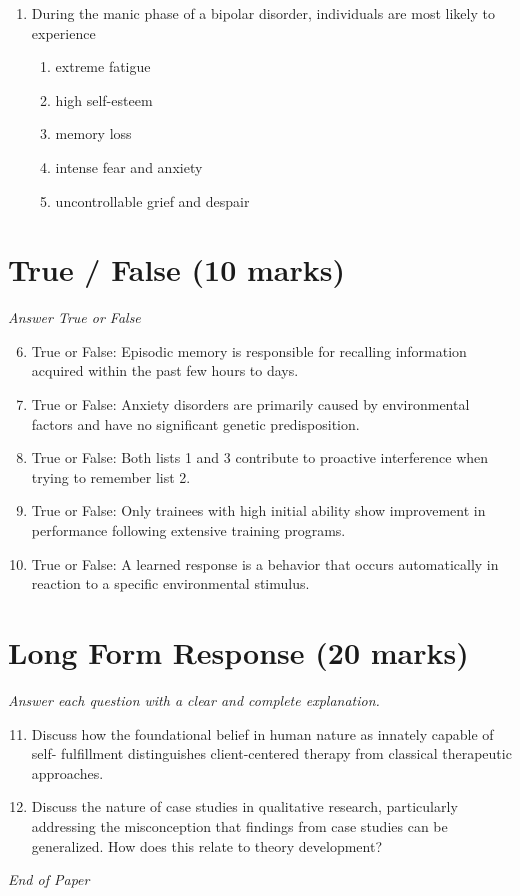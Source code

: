 \documentclass[12pt]{article}
\begin{document}
\begin{enumerate}[label=\arabic*.]
\begin{enumerate}[label=(\alph*)]
    \item Kendal's tau
    \item Biserial correlation
    \item Cramer's V
    \item Eta
    \item Goodman and Kruskal's gamma
\end{enumerate}
\item During the manic phase of a bipolar disorder, individuals are most likely to experience
\begin{enumerate}[label=(\alph*)]
    \item extreme fatigue
    \item high self-esteem
    \item memory loss
    \item intense fear and anxiety
    \item uncontrollable grief and despair
\end{enumerate}
\end{enumerate}

\section*{True / False (10 marks)}
\textit{Answer True or False}
\begin{enumerate}[label=\arabic*.]
\setcounter{enumi}{5}
\item True or False: Episodic memory is responsible for recalling information acquired within the past few hours to days.
\item True or False: Anxiety disorders are primarily caused by environmental factors and have no significant genetic predisposition.
\item True or False: Both lists 1 and 3 contribute to proactive interference when trying to remember list 2.
\item True or False: Only trainees with high initial ability show improvement in performance following extensive training programs.
\item True or False: A learned response is a behavior that occurs automatically in reaction to a specific environmental stimulus.
\end{enumerate}

\section*{Long Form Response (20 marks)}
\textit{Answer each question with a clear and complete explanation.}
\begin{enumerate}[label=\arabic*.]
\setcounter{enumi}{10}
\item Discuss how the foundational belief in human nature as innately capable of self- fulfillment distinguishes client-centered therapy from classical therapeutic approaches.
\item Discuss the nature of case studies in qualitative research, particularly addressing the misconception that findings from case studies can be generalized. How does this relate to theory development?
\end{enumerate}

\vfill
\noindent\textit{End of Paper}
\end{document}
